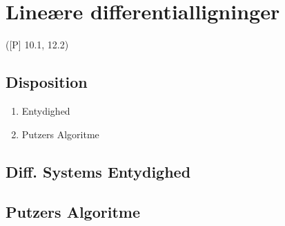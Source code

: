 \newpage
\chapter{Lineære differentialligninger}
([P] 10.1, 12.2)

\section*{Disposition}
\begin{enumerate}
	\item Entydighed
	\item Putzers Algoritme
\end{enumerate}

\section{Diff. Systems Entydighed}


\section{Putzers Algoritme}

